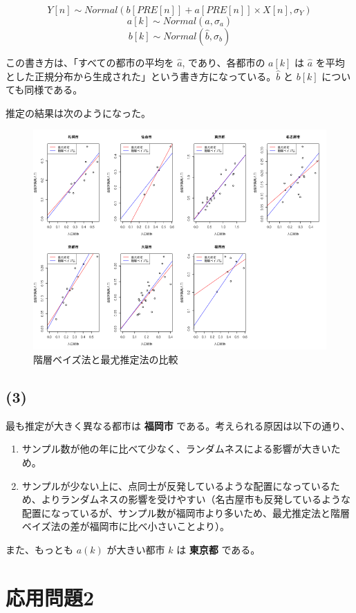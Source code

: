 \[
Y[n] \sim Normal(b[PRE[n]] + a[PRE[n]] \times X[n], \sigma_Y)
\] \[
a[k] \sim Normal(\hat{a}, \sigma_a)
\] \[
b[k] \sim Normal(\hat{b}, \sigma_b)
\]

この書き方は、「すべての都市の平均を \(\hat{a}\), であり、各都市の
\(a[k]\) は \(\hat{a}\)
を平均とした正規分布から生成された」という書き方になっている。\(\hat{b}\)
と \(b[k]\) についても同様である。

推定の結果は次のようになった。

\begin{figure}
\centering
\includegraphics[width=14.00000cm]{../src/output/image/mle-mcmc.png}
\caption{階層ベイズ法と最尤推定法の比較}
\end{figure}

\subsection*{(3)}\label{section-2}

最も推定が大きく異なる都市は \textbf{福岡市}
である。考えられる原因は以下の通り、

\begin{enumerate}
\def\labelenumi{\arabic{enumi}.}
\tightlist
\item
  サンプル数が他の年に比べて少なく、ランダムネスによる影響が大きいため。
\item
  サンプルが少ない上に、点同士が反発しているような配置になっているため、よりランダムネスの影響を受けやすい（名古屋市も反発しているような配置になっているが、サンプル数が福岡市より多いため、最尤推定法と階層ベイズ法の差が福岡市に比べ小さいことより）。
\end{enumerate}

また、もっとも \(a(k)\) が大きい都市 \(k\) は \textbf{東京都} である。

\section*{応用問題2}\label{ux5fdcux7528ux554fux984c2}

